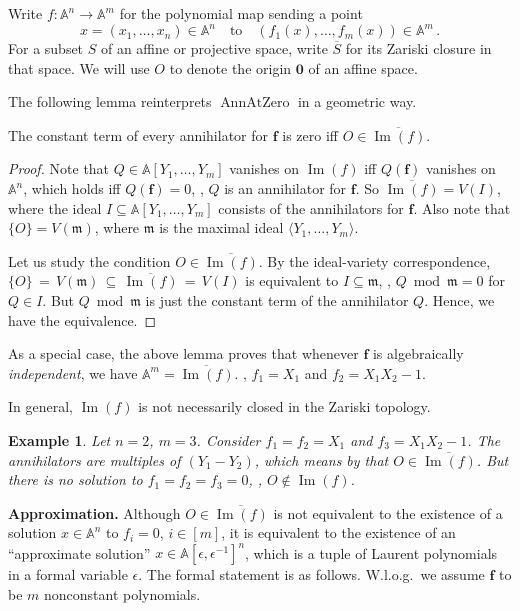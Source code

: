 \documentclass{toc}
\newtheorem{exmp}{Example}
\newcommand{\aff}{\mathbb{A}}
\DeclareMathOperator{\im}{\mathrm{Im}}
\newcommand{\ol}[1]{\overline{#1}}
\newcommand{\m}{\mathfrak{m}}
\DeclareMathOperator{\AnnAtZero}{\mathrm{AnnAtZero}\xspace} %
\begin{document}
Write $f:\aff^n\to \aff^m$ for the polynomial map sending a point
\[
  x=(x_1,\dots,x_n)\in \aff^n\quad\text{to}\quad (f_1(x),\dots,f_m(x))\in \aff^m\,.
  \]
  For a subset $S$ of an affine or projective space, write
  $\overline{S}$ for its Zariski closure in that space. We will use
  $O$ to denote the origin $\mathbf 0$ of an affine space.

%
 
The following lemma reinterprets $\AnnAtZero$ in a geometric way.
 \begin{lemma}[classical]\label{lem_geom}
 The constant term of every annihilator for $\mathbf f$ is zero iff $O\in \overline{\im(f)}$. %
 \end{lemma}
 \begin{proof}
 Note that %
 $Q\in \aff[Y_1,\dots,Y_m]$ vanishes on $\im(f)$ iff $Q(\mathbf f)$ vanishes on $\aff^n$, which holds iff $Q(\mathbf f)=0$, \ie, $Q$ is an annihilator for $\mathbf f$. So $\overline{\im(f)}=V(I)$, where the ideal $I\subseteq \aff[Y_1,\dots,Y_m]$ consists of the annihilators for $\mathbf f$. Also note that $\{O\}=V(\m)$, where $\m$ is the maximal ideal $\langle Y_1,\dots, Y_m\rangle$.

Let us study the condition $O\in \overline{\im(f)}$.
 By the ideal-variety correspondence, $\{O\} \,=\, V(\m) \,\subseteq\, \overline{\im(f)} \,=\, V(I)$ is equivalent to $I\subseteq \m$, \ie,  $Q\bmod \m=0$ for  $Q\in I$. But $Q\bmod \m$ is just the constant term of the annihilator $Q$. Hence, we have the equivalence.
 \end{proof}
 
%
%
As a special case,
%
the above lemma proves that
whenever $\mathbf f$
%
is  %
algebraically \emph{independent}, we have $\aff^m=\ol{\im(f)}$. \Eg, $f_1=X_1$ and $f_2=X_1 X_2-1$. 
%

In general, %
$\im(f)$ is not necessarily closed in the Zariski topology. 
\begin{exmp}\label{exmp_closure}
Let $n=2$, $m=3$. Consider $f_1=f_2=X_1$ and $f_3=X_1 X_2-1$. The annihilators are multiples of $(Y_1-Y_2)$, which means by  that $O\in \ol{\im(f)}$. But there is no solution to $f_1=f_2=f_3=0$, \ie, $O\notin \im(f)$.
\end{exmp}

\noindent
\textbf{Approximation.} Although $O\in \overline{\im(f)}$ is not equivalent to the existence of a solution $x\in \aff^n$ to $f_i=0$, $i\in[m]$, it is equivalent to the existence of an  ``approximate solution'' $x\in \aff[\epsilon,\epsilon^{-1}]^n$, which is a tuple of Laurent polynomials in a formal variable $\epsilon$. The formal statement is as follows. W.l.o.g.\ we assume $\mathbf f$ to be $m$ nonconstant polynomials.
\end{document}
